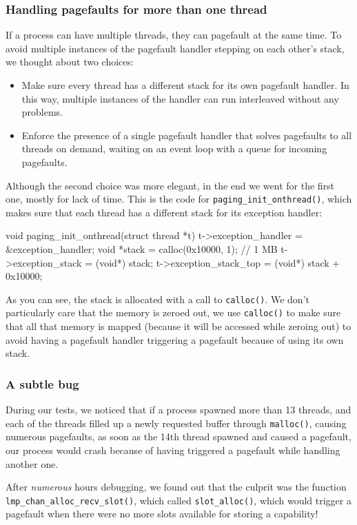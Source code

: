 \documentclass[a4paper,twoside,openright]{report}
\renewcommand{\t}[1]{%
	{\texttt{#1}}}
\begin{document}
\subsubsection{Handling pagefaults for more than one thread}
If a process can have multiple threads, they can pagefault at the same time. To
avoid multiple instances of the pagefault handler stepping on each other's
stack, we thought
about two choices:
\begin{itemize}
	\item Make sure every thread has a different stack for its own pagefault
		handler. In this way, multiple instances of the handler can run
		interleaved without any problems.
	\item Enforce the presence of a single pagefault handler that solves
		pagefaults to all threads on demand, waiting on an event loop with a
		queue for incoming pagefaults.
\end{itemize}
Although the second choice was more elegant, in the end we went for the first
one, mostly for lack of time. This is the code for
\t{paging\_init\_onthread()}, which makes sure that each thread has a different
stack for its exception handler:
\begin{pandacode}
void paging_init_onthread(struct thread *t) {
	t->exception_handler = &exception_handler;
	void *stack = calloc(0x10000, 1); // 1 MB
	t->exception_stack = (void*) stack;
	t->exception_stack_top = (void*) stack + 0x10000;
}
\end{pandacode}
As you can see, the stack is allocated with a call to \t{calloc()}. We don't
particularly care that the memory is zeroed out, we use \t{calloc()} to make
sure that all that memory is mapped (because it will be accessed while zeroing
out) to avoid having a pagefault handler triggering a pagefault because of
using its own stack.


\subsubsection{A subtle bug}
During our tests, we noticed that if a process spawned more than 13 threads,
and each of the threads filled up a newly requested buffer through \t{malloc()},
causing numerous pagefaults, as soon as the 14th thread spawned and caused a 
pagefault, our process would crash because of having triggered a pagefault while
handling another one.

After \emph{numerous} hours debugging, we found out that the culprit was the function
\t{lmp\_chan\_alloc\_recv\_slot()}, which called \t{slot\_alloc()}, which
would trigger a pagefault when there were no more slots available for storing
a capability!
\end{document}
